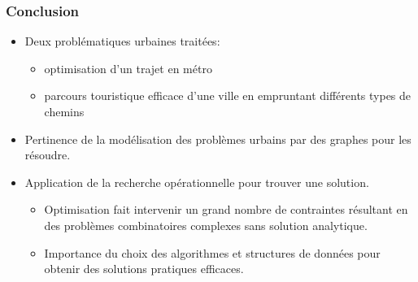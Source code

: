 \documentclass[10pt]{beamer}
\begin{document}
\begin{frame}
\frametitle{Conclusion}
\begin{itemize}
\item Deux problématiques urbaines traitées: 
  \begin{itemize}
  \item optimisation d'un trajet en métro
  \item parcours touristique efficace d'une ville en empruntant différents types de chemins
  \end{itemize}
\item Pertinence de la modélisation des problèmes urbains par des graphes pour les résoudre.
\item Application de la recherche opérationnelle pour trouver une solution.
  \begin{itemize}
  \item Optimisation fait intervenir un grand nombre de contraintes
résultant en des problèmes combinatoires complexes sans solution analytique.
  \item Importance du choix des algorithmes et structures de données pour obtenir des solutions pratiques efficaces.
  \end{itemize}
\end{itemize}
\end{frame}
\end{document}
